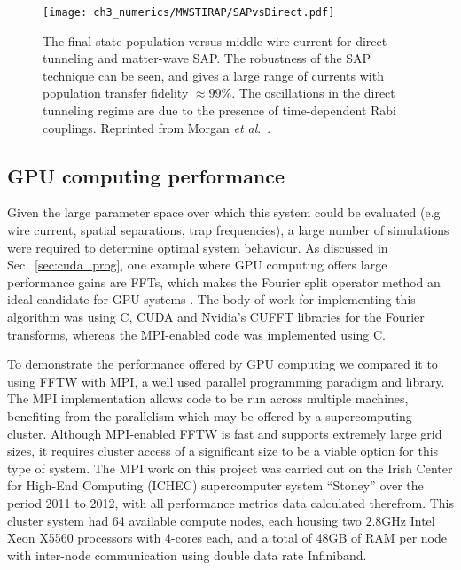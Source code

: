 \begin{figure}[tb]
    \centering
  \texttt{[image: ch3\_numerics/MWSTIRAP/SAPvsDirect.pdf]}
  \caption{The final state population versus middle wire current for direct tunneling and matter-wave SAP. The robustness of the SAP technique can be seen, and gives a large range of currents with population transfer fidelity $\approx 99 \%$. The oscillations in the direct tunneling regime are due to the presence of time-dependent Rabi couplings. Reprinted from Morgan {\textit{et al}.}~\cite{AO:Morgan_pra_2013}.}
  \label{fig:DIRVSMWSTIRAP}
\end{figure}

\subsection{GPU computing performance}
Given the large parameter space over which this system could be evaluated (e.g wire current, spatial separations, trap frequencies), a large number of simulations were required to determine optimal system behaviour. As discussed in Sec.~\ref{sec:cuda_prog}, one example where GPU computing offers large performance gains are FFTs, which makes the Fourier split operator method an ideal candidate for GPU systems \cite{Num:Bauke_cpc_2011}. The body of work for implementing this algorithm was using C, CUDA and Nvidia's CUFFT libraries for the Fourier transforms, whereas the MPI-enabled code was implemented using C.

To demonstrate the performance offered by GPU computing we compared it to using FFTW with MPI, a well used parallel programming paradigm and library. The MPI implementation allows code to be run across multiple machines, benefiting from the parallelism which may be offered by a supercomputing cluster. Although MPI-enabled FFTW is fast and supports extremely large grid sizes, it requires cluster access of a significant size to be a viable option for this type of system. The MPI work on this project was carried out on the Irish Center for High-End Computing (ICHEC) supercomputer system ``Stoney'' \cite{Ichec_stoney} over the period 2011 to 2012, with all performance metrics data calculated therefrom. This cluster system had 64 available compute nodes, each housing two 2.8GHz Intel Xeon X5560 processors with 4-cores each, and a total of 48GB of RAM per node with inter-node communication using double data rate Infiniband.

